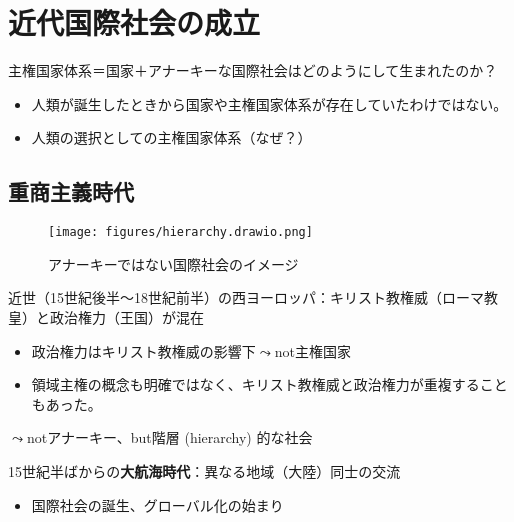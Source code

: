 \documentclass[
  xelatex,
  ja=standard]{bxjsarticle}
\providecommand{\tightlist}{%
  \setlength{\itemsep}{0pt}\setlength{\parskip}{0pt}}\usepackage{longtable,booktabs,array}
\begin{document}
\hypertarget{ux8fd1ux4ee3ux56fdux969bux793eux4f1aux306eux6210ux7acb}{%
\section{近代国際社会の成立}\label{ux8fd1ux4ee3ux56fdux969bux793eux4f1aux306eux6210ux7acb}}

主権国家体系＝国家＋アナーキーな国際社会はどのようにして生まれたのか？

\begin{itemize}
\tightlist
\item
  人類が誕生したときから国家や主権国家体系が存在していたわけではない。
\item
  人類の選択としての主権国家体系（なぜ？）
\end{itemize}

\hypertarget{ux91cdux5546ux4e3bux7fa9ux6642ux4ee3}{%
\subsection{重商主義時代}\label{ux91cdux5546ux4e3bux7fa9ux6642ux4ee3}}

\begin{figure}[htpb]

{\centering \texttt{[image: figures/hierarchy.drawio.png]}

}

\caption{アナーキーではない国際社会のイメージ}

\end{figure}

近世（15世紀後半〜18世紀前半）の西ヨーロッパ：キリスト教権威（ローマ教皇）と政治権力（王国）が混在

\begin{itemize}
\tightlist
\item
  政治権力はキリスト教権威の影響下\(\leadsto\)not主権国家
\item
  領域主権の概念も明確ではなく、キリスト教権威と政治権力が重複することもあった。
\end{itemize}

\(\leadsto\)notアナーキー、but階層 (hierarchy) 的な社会

15世紀半ばからの\textbf{大航海時代}：異なる地域（大陸）同士の交流

\begin{itemize}
\tightlist
\item
  国際社会の誕生、グローバル化の始まり
\end{itemize}
\end{document}
